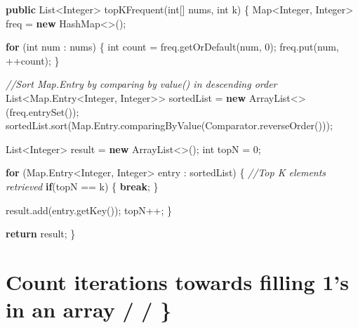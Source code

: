 \documentclass[]{book}
\newenvironment{Shaded}{\begin{snugshade}}{\end{snugshade}}
\newcommand{\BuiltInTok}[1]{#1}
\newcommand{\CommentTok}[1]{\textcolor[rgb]{0.56,0.35,0.01}{\textit{#1}}}
\newcommand{\DataTypeTok}[1]{\textcolor[rgb]{0.13,0.29,0.53}{#1}}
\newcommand{\DecValTok}[1]{\textcolor[rgb]{0.00,0.00,0.81}{#1}}
\newcommand{\FunctionTok}[1]{\textcolor[rgb]{0.00,0.00,0.00}{#1}}
\newcommand{\KeywordTok}[1]{\textcolor[rgb]{0.13,0.29,0.53}{\textbf{#1}}}
\newcommand{\NormalTok}[1]{#1}
\begin{document}
\begin{Shaded}
\begin{Highlighting}[]
\KeywordTok{public} \BuiltInTok{List}\NormalTok{<}\BuiltInTok{Integer}\NormalTok{> }\FunctionTok{topKFrequent}\NormalTok{(}\DataTypeTok{int}\NormalTok{[] nums, }\DataTypeTok{int}\NormalTok{ k) \{}
    \BuiltInTok{Map}\NormalTok{<}\BuiltInTok{Integer}\NormalTok{, }\BuiltInTok{Integer}\NormalTok{> freq = }\KeywordTok{new} \BuiltInTok{HashMap}\NormalTok{<>();}

    \KeywordTok{for}\NormalTok{ (}\DataTypeTok{int}\NormalTok{ num : nums) \{}
        \DataTypeTok{int}\NormalTok{ count = freq.}\FunctionTok{getOrDefault}\NormalTok{(num, }\DecValTok{0}\NormalTok{);}
\NormalTok{        freq.}\FunctionTok{put}\NormalTok{(num, ++count);}
\NormalTok{    \}}

    \CommentTok{//Sort Map.Entry by comparing by value() in descending order}
    \BuiltInTok{List}\NormalTok{<}\BuiltInTok{Map}\NormalTok{.}\FunctionTok{Entry}\NormalTok{<}\BuiltInTok{Integer}\NormalTok{, }\BuiltInTok{Integer}\NormalTok{>> sortedList = }\KeywordTok{new} \BuiltInTok{ArrayList}\NormalTok{<>(freq.}\FunctionTok{entrySet}\NormalTok{());}
\NormalTok{    sortedList.}\FunctionTok{sort}\NormalTok{(}\BuiltInTok{Map}\NormalTok{.}\FunctionTok{Entry}\NormalTok{.}\FunctionTok{comparingByValue}\NormalTok{(}\BuiltInTok{Comparator}\NormalTok{.}\FunctionTok{reverseOrder}\NormalTok{()));}


    \BuiltInTok{List}\NormalTok{<}\BuiltInTok{Integer}\NormalTok{> result = }\KeywordTok{new} \BuiltInTok{ArrayList}\NormalTok{<>();}
    \DataTypeTok{int}\NormalTok{ topN = }\DecValTok{0}\NormalTok{;}

    \KeywordTok{for}\NormalTok{ (}\BuiltInTok{Map}\NormalTok{.}\FunctionTok{Entry}\NormalTok{<}\BuiltInTok{Integer}\NormalTok{, }\BuiltInTok{Integer}\NormalTok{> entry : sortedList) \{}
        \CommentTok{//Top K elements retrieved}
        \KeywordTok{if}\NormalTok{(topN == k) \{}
            \KeywordTok{break}\NormalTok{;}
\NormalTok{        \}}

\NormalTok{        result.}\FunctionTok{add}\NormalTok{(entry.}\FunctionTok{getKey}\NormalTok{());}
\NormalTok{        topN++;}
\NormalTok{    \}}

    \KeywordTok{return}\NormalTok{ result;}
\NormalTok{\}}
\end{Highlighting}
\end{Shaded}

\hypertarget{count-iterations-towards-filling-1s-in-an-array}{%
\section{Count iterations towards filling 1's in an array / / \}}\label{count-iterations-towards-filling-1s-in-an-array}}
\end{document}
